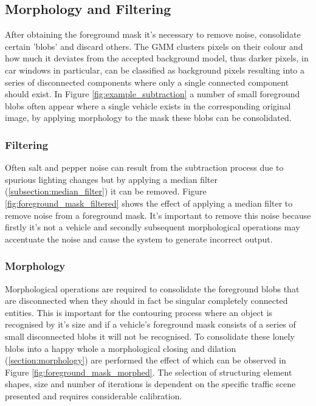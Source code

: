 \subsection{Morphology and Filtering}

After obtaining the foreground mask it's necessary to remove noise, consolidate certain 'blobs' and discard others. The GMM clusters pixels on their colour and how much it deviates from the accepted background model, thus darker pixels, in car windows in particular, can be classified as background pixels resulting into a series of disconnected components where only a single connected component should exist. In Figure \ref{fig:example_subtraction} a number of small foreground blobs often appear where a single vehicle exists in the corresponding original image, by applying morphology to the mask these blobs can be consolidated.

\subsubsection{Filtering}

Often salt and pepper noise can result from the subtraction process due to spurious lighting changes but by applying a median filter (\ref{subsection:median_filter}) it can be removed. Figure \ref{fig:foreground_mask_filtered} shows the effect of applying a median filter to remove noise from a foreground mask. It's important to remove this noise because firstly it's not a vehicle and secondly subsequent morphological operations may accentuate the noise and cause the system to generate incorrect output.


\subsubsection{Morphology}

Morphological operations are required to consolidate the foreground blobs that are disconnected when they should in fact be singular completely connected entities. This is important for the contouring process where an object is recognised by it's size and if a vehicle's foreground mask consists of a series of small disconnected blobs it will not be recognised. To consolidate these lonely blobs into a happy whole a morphological closing and dilation (\ref{section:morphology}) are performed the effect of which can be observed in Figure \ref{fig:foreground_mask_morphed}. The selection of structuring element shapes, size and number of iterations is dependent on the specific traffic scene presented and requires considerable calibration. 

